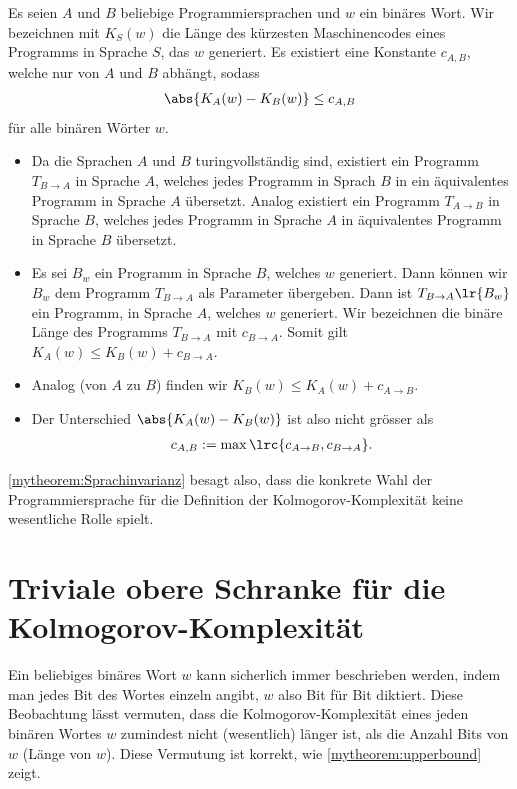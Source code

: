 \begin{mytheorem}[Sprachinvarianz]\label{mytheorem:Sprachinvarianz}
	Es seien $A$ und $B$ beliebige Programmiersprachen und $w$ ein binäres Wort. Wir bezeichnen mit $K_S(w)$ die Länge des kürzesten Maschinencodes eines Programms in Sprache $S$, das $w$ generiert.
	Es existiert eine Konstante $c_{A, B}$, welche nur von $A$ und $B$ abhängt, sodass
	\begin{align*}
		\abs{K_A(w) - K_B(w)} \leq c_{A, B}
	\end{align*}
	für alle binären Wörter $w$.
	\begin{myproof}
		\leavevmode
		\begin{itemize}
			\item Da die Sprachen $A$ und $B$ turingvollständig sind, existiert ein Programm $T_{B\to A}$ in Sprache $A$, welches jedes Programm in Sprach $B$ in ein äquivalentes Programm in Sprache $A$ übersetzt. Analog existiert ein Programm $T_{A\to B}$ in Sprache $B$, welches jedes Programm in Sprache $A$ in äquivalentes Programm in Sprache $B$ übersetzt.
			\item Es sei $B_w$ ein Programm in Sprache $B$, welches $w$ generiert. Dann können wir $B_w$ dem Programm $T_{B\to A}$ als Parameter übergeben. Dann ist $T_{B\to A}\lr{B_w}$ ein Programm, in Sprache $A$, welches $w$ generiert.
			      Wir bezeichnen die binäre Länge des Programms $T_{B\to A}$ mit $c_{B\to A}$. Somit gilt $K_A(w) \leq K_B(w) + c_{B\to A}$.
			\item Analog (von $A$ zu $B$) finden wir $K_B(w) \leq K_A(w) + c_{A\to B}$.
			\item Der Unterschied $\abs{K_A(w) - K_B(w)}$ ist also nicht grösser als
			\begin{align*}
				c_{A, B} := \max\lrc{c_{A\to B}, c_{B\to A}}.	
			\end{align*}
		\end{itemize}
	\end{myproof}
\end{mytheorem}
\cref{mytheorem:Sprachinvarianz} besagt also, dass die konkrete Wahl der Programmiersprache für die Definition der Kolmogorov-Komplexität keine wesentliche Rolle spielt.

\section{Triviale obere Schranke für die Kolmogorov-Komplexität}
Ein beliebiges binäres Wort $w$ kann sicherlich immer beschrieben werden, indem man jedes Bit des Wortes einzeln angibt, $w$ also Bit für Bit diktiert. Diese Beobachtung lässt vermuten, dass die Kolmogorov-Komplexität eines jeden binären Wortes $w$ zumindest nicht (wesentlich) länger ist, als die Anzahl Bits von $w$ (Länge von $w$). Diese Vermutung ist korrekt, wie \cref{mytheorem:upperbound} zeigt.

